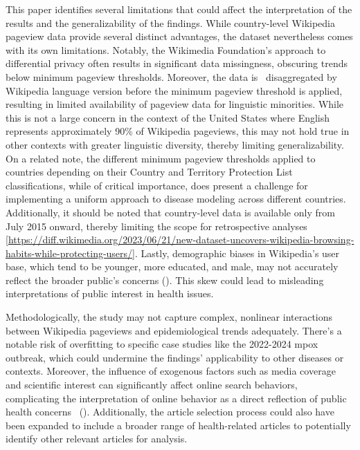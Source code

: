 \documentclass[
  12pt,
]{article}
\begin{document}
This paper identifies several limitations that could affect the
interpretation of the results and the generalizability of the findings.
While country-level Wikipedia pageview data provide several distinct
advantages, the dataset nevertheless comes with its own limitations.
Notably, the Wikimedia Foundation's approach to differential privacy
often results in significant data missingness, obscuring trends below
minimum pageview thresholds. Moreover, the data is~ disaggregated by
Wikipedia language version before the minimum pageview threshold is
applied, resulting in limited availability of pageview data for
linguistic minorities. While this is not a large concern in the context
of the United States where English represents approximately 90\% of
Wikipedia pageviews, this may not hold true in other contexts with
greater linguistic diversity, thereby limiting generalizability. On a
related note, the different minimum pageview thresholds applied to
countries depending on their Country and Territory Protection List
classifications, while of critical importance, does present a challenge
for implementing a uniform approach to disease modeling across different
countries. Additionally, it should be noted that country-level data is
available only from July 2015 onward, thereby limiting the scope for
retrospective analyses
{[}\url{https://diff.wikimedia.org/2023/06/21/new-dataset-uncovers-wikipedia-browsing-habits-while-protecting-users/}{]}.
Lastly, demographic biases in Wikipedia's user base, which tend to be
younger, more educated, and male, may not accurately reflect the broader
public's concerns (). This
skew could lead to misleading interpretations of public interest in
health issues.~

Methodologically, the study may not capture complex, nonlinear
interactions between Wikipedia pageviews and epidemiological trends
adequately. There's a notable risk of overfitting to specific case
studies like the 2022-2024 mpox outbreak, which could undermine the
findings' applicability to other diseases or contexts. Moreover, the
influence of exogenous factors such as media coverage and scientific
interest can significantly affect online search behaviors, complicating
the interpretation of online behavior as a direct reflection of public
health concerns~ ().
Additionally, the article selection process could also have been
expanded to include a broader range of health-related articles to
potentially identify other relevant articles for analysis.
\end{document}

